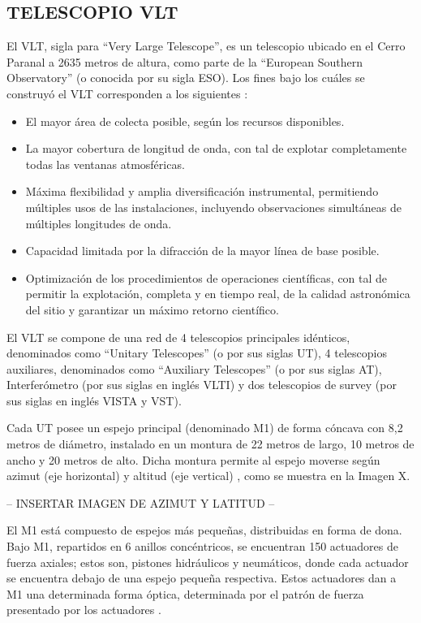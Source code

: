
\subsection{TELESCOPIO VLT}
El VLT, sigla para “Very Large Telescope”, es un telescopio ubicado en el Cerro Paranal a 2635 metros de altura, como parte de la “European Southern Observatory” (o conocida por su sigla ESO). 
Los fines bajo los cuáles se construyó el VLT corresponden a los siguientes \cite{eso1998vlt}:
\begin{itemize}

    \item El mayor área de colecta posible, según los recursos disponibles.
    \item La mayor cobertura de longitud de onda, con tal de explotar completamente todas las ventanas atmosféricas.
    \item Máxima flexibilidad y amplia diversificación instrumental, permitiendo múltiples usos de las instalaciones, incluyendo observaciones simultáneas de múltiples longitudes de onda.
    \item Capacidad limitada por la difracción de la mayor línea de base posible.
    \item Optimización de los procedimientos de operaciones científicas, con tal de permitir la explotación, completa y en tiempo real, de la calidad astronómica del sitio y garantizar un máximo retorno científico.

\end{itemize}

El VLT se compone de una red de 4 telescopios principales idénticos, denominados como “Unitary Telescopes” (o por sus siglas UT), 4 telescopios auxiliares, denominados como “Auxiliary Telescopes” (o por sus siglas AT), Interferómetro (por sus siglas en inglés VLTI) y dos telescopios de survey (por sus siglas en inglés VISTA y VST).

Cada UT posee un espejo principal (denominado M1) de forma cóncava con 8,2 metros de diámetro, instalado en un montura de 22 metros de largo, 10 metros de ancho y 20 metros de alto. Dicha montura permite al espejo moverse según azimut (eje horizontal) y altitud (eje vertical) \cite{eso1998vlt}, como se muestra en la Imagen X.

-- INSERTAR IMAGEN DE AZIMUT Y LATITUD --

El M1 está compuesto de espejos más pequeñas, distribuidas en forma de dona. Bajo M1, repartidos en 6 anillos concéntricos, se encuentran 150 actuadores de fuerza axiales; estos son, pistones hidráulicos y neumáticos, donde cada actuador se encuentra debajo de una espejo pequeña respectiva. Estos actuadores dan a M1 una determinada forma óptica, determinada por el patrón de fuerza presentado por los actuadores \cite{eso1998vlt}.

